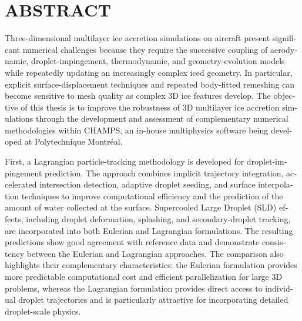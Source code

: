 
\chapter*{ABSTRACT}\thispagestyle{headings}

\begin{otherlanguage}{english}

Three-dimensional multilayer ice accretion simulations on aircraft present significant numerical challenges because they require the successive coupling of aerodynamic, droplet-impingement, thermodynamic, and geometry-evolution models while repeatedly updating an increasingly complex iced geometry. In particular, explicit surface-displacement techniques and repeated body-fitted remeshing can become sensitive to mesh quality as complex 3D ice features develop. The objective of this thesis is to improve the robustness of 3D multilayer ice accretion simulations through the development and assessment of complementary numerical methodologies within \textsc{CHAMPS}, an in-house multiphysics software being developed at Polytechnique Montréal.

First, a Lagrangian particle-tracking methodology is developed for droplet-impingement prediction. The approach combines implicit trajectory integration, accelerated intersection detection, adaptive droplet seeding, and surface interpolation techniques to improve computational efficiency and the prediction of the amount of water collected at the surface. Supercooled Large Droplet (SLD) effects, including droplet deformation, splashing, and secondary-droplet tracking, are incorporated into both Eulerian and Lagrangian formulations. The resulting predictions show good agreement with reference data and demonstrate consistency between the Eulerian and Lagrangian approaches. The comparison also highlights their complementary characteristics: the Eulerian formulation provides more predictable computational cost and efficient parallelization for large 3D problems, whereas the Lagrangian formulation provides direct access to individual droplet trajectories and is particularly attractive for incorporating detailed droplet-scale physics.


\end{otherlanguage}
